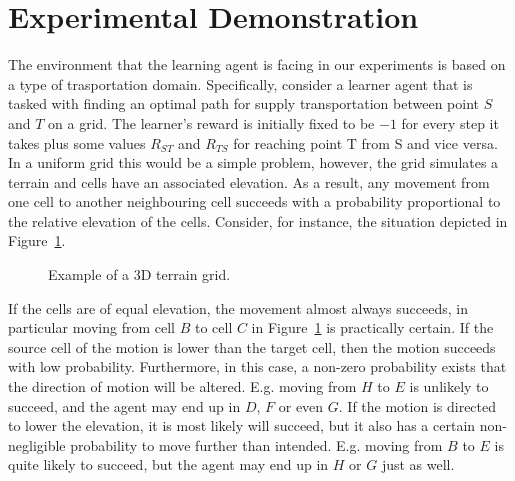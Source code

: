 \section{Experimental Demonstration}\label{sec: experiments}
The environment that the learning agent is facing in our experiments
is based on a type of trasportation domain. Specifically, consider a
learner agent that is tasked with finding an optimal path for supply
transportation between point $S$ and $T$ on a grid. The learner's
reward is initially fixed to be $-1$ for every step it takes plus some
values $R_{ST}$ and $R_{TS}$ for reaching point T from S and vice
versa. In a uniform grid this would be a simple problem, however, the
grid simulates a terrain and cells have an associated elevation.  As a
result, any movement from one cell to another neighbouring cell
succeeds with a probability proportional to the relative elevation of
the cells. Consider, for instance, the situation depicted in
Figure~\ref{exp_motion}.

\begin{figure}[ht]
\centerline{}
\caption{\label{exp_motion}Example of a 3D terrain grid.}
\end{figure}

If the cells are of equal elevation, the movement almost always
succeeds, in particular moving from cell $B$ to cell $C$ in
Figure~\ref{exp_motion} is practically certain. If the source cell of
the motion is lower than the target cell, then the motion succeeds
with low probability. Furthermore, in this case, a non-zero
probability exists that the direction of motion will be
altered. E.g. moving from $H$ to $E$ is unlikely to succeed, and the
agent may end up in $D$, $F$ or even $G$. If the motion is directed to
lower the elevation, it is most likely will succeed, but it also has a
certain non-negligible probability to move further than
intended. E.g. moving from $B$ to $E$ is quite likely to succeed, but
the agent may end up in $H$ or $G$ just as well.

